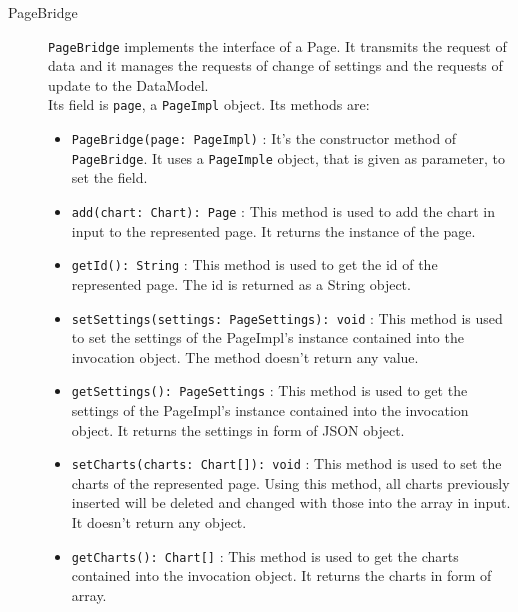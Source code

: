 \begin{description}
\begin{itemize}
		\end{itemize}
	\item[PageBridge] \texttt{PageBridge} implements the interface of a Page. It transmits the request of data and it manages the requests of change of settings and the requests of update to the DataModel.\\
	Its field is \texttt{page}, a \texttt{PageImpl} object.
	Its methods are:
	\begin{itemize}
		\item \texttt{PageBridge(page: PageImpl)} : It's the constructor method of \texttt{PageBridge}. It uses a \texttt{PageImple} object, that is given as parameter, to set the field.
		\item \texttt{add(chart: Chart): Page} : This method is used to add the chart in input to the represented page. It returns the instance of the page.
		\item \texttt{getId(): String} : This method is used to get the id of the represented page. The id is returned as a String object.
		\item \texttt{setSettings(settings: PageSettings): void} : This method is used to set the settings of the PageImpl's instance contained into the invocation object. The method doesn't return any value.
		\item \texttt{getSettings(): PageSettings} : This method is used to get the settings of the PageImpl's instance contained into the invocation object. It returns the settings in form of JSON object.
		\item \texttt{setCharts(charts: Chart[]): void} : This method is used to set the charts of the represented page. Using this method, all charts previously inserted will be deleted and changed with those into the array in input. It doesn't return any object.
		\item \texttt{getCharts(): Chart[]} : This method is used to get the charts contained into the invocation object. It returns the charts in form of array.
	\end{itemize}
	

\end{description}
